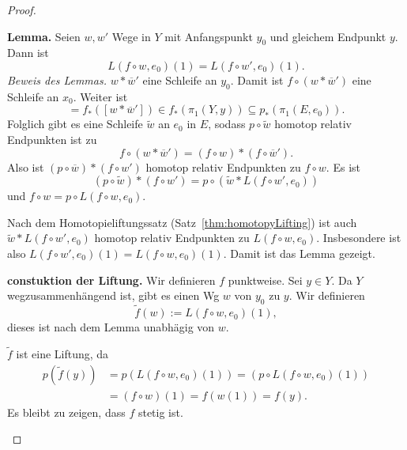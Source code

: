 \documentclass[language=ngerman]{TemplateLecture} %
\begin{document}
\begin{proof}
\begin{description}
        \textbf{Lemma.} Seien $w, w'$ Wege in $Y$ mit Anfangspunkt $y_0$ und gleichem Endpunkt $y$. Dann ist 
        \begin{equation*}
            L(f \circ w, e_0)(1)  = L(f \circ w', e_0)(1).
        \end{equation*}
        \emph{Beweis des Lemmas.} $w * \overline{w}'$ eine Schleife an $y_0$. Damit ist $f \circ (w * \overline{w}')$ eine Schleife an $x_0$. Weiter ist 
        \begin{equation*}
            [f \circ (w * \overline{w}')] = f_*([w * \overline{w}']) \in f_*(\pi_1(Y,y)) \subseteq p_*(\pi_1(E,e_0)).
        \end{equation*}
        Folglich gibt es eine Schleife $\tilde{w}$ an $e_0$ in $E$, sodass $p \circ \tilde{w}$ homotop relativ Endpunkten ist zu
        \begin{equation*}
            f \circ (w * \overline{w}') = (f \circ w) * (f \circ \overline{w}').
        \end{equation*}
        Also ist $(p \circ \overline{w}) * (f \circ w')$ homotop relativ Endpunkten zu $f \circ w$. Es ist 
        \begin{equation*}
            (p \circ \tilde{w}) * (f \circ w') = p \circ (\tilde{w} * L(f \circ w', e_0))
        \end{equation*}
        und $f \circ w = p \circ L(f \circ w, e_0)$.

        Nach dem Homotopieliftungssatz (Satz~\ref{thm:homotopyLifting}) ist auch $\tilde{w} * L(f \circ w', e_0)$ homotop relativ Endpunkten zu $L(f \circ w, e_0)$. Insbesondere ist also $L(f \circ w', e_0)(1) = L(f \circ w, e_0)(1)$. Damit ist das Lemma gezeigt.

        \textbf{constuktion der Liftung.} Wir definieren $f$ punktweise. Sei $y \in Y$. Da $Y$ wegzusammenhängend ist, gibt es einen Wg $w$ von $y_0$ zu $y$. Wir definieren 
        \begin{equation*}
            \tilde{f}(w) := L(f \circ w, e_0)(1),
        \end{equation*}
        dieses ist nach dem Lemma unabhägig von $w$.

        $\tilde{f}$ ist eine Liftung, da 
        \begin{align*}
            p(\tilde{f}(y)) &= p(L(f \circ w, e_0)(1)) = (p \circ L(f \circ w, e_0)(1)) \\
            &= (f \circ w)(1) = f(w(1)) = f(y).
        \end{align*}
        Es bleibt zu zeigen, dass $f$ stetig ist.


\end{description}
\end{proof}
\end{document}
